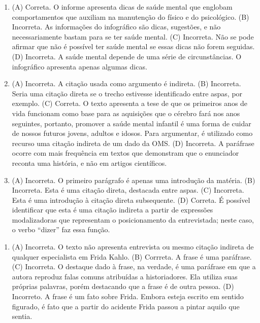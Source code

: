 \begin{enumerate}
\item (A) Correta. O informe apresenta dicas de saúde mental que englobam
comportamentos que auxiliam na manutenção do físico e do psicológico.
(B) Incorreta. As informações do infográfico são dicas, sugestões, e não
necessariamente bastam para se ter saúde mental.
(C) Incorreta. Não se pode afirmar que não é possível ter saúde mental se
essas dicas não forem seguidas.
(D) Incorreta. A saúde mental depende de uma série de circunstâncias. O
infográfico apresenta apenas algumas dicas.

\item (A) Incorreta. A citação usada como argumento é indireta.
(B) Incorreta. Seria uma citação direta se o trecho estivesse
identificado entre aspas, por exemplo.
(C) Correta. O texto apresenta a tese de que os primeiros anos de vida
funcionam como base para as aquisições que o cérebro fará nos anos
seguintes, portanto, promover a saúde mental infantil é uma forma de
cuidar de nossos futuros jovens, adultos e idosos. Para argumentar, é
utilizado como recurso uma citação indireta de um dado da OMS.
(D) Incorreta. A paráfrase ocorre com mais frequência em textos que
demonstram que o enunciador reconta uma história, e não em artigos
científicos.

\item (A) Incorreta. O primeiro parágrafo é apenas uma introdução da matéria.
(B) Incorreta. Esta é uma citação direta, destacada entre aspas.
(C) Incorreta. Esta é uma introdução à citação direta subsequente.
(D) Correta. É possível identificar que esta é uma citação indireta a
partir de expressões modalizadoras que representam o posicionamento da
entrevistada; neste caso, o verbo ``dizer'' faz essa função.
\end{enumerate}


\begin{enumerate}
\item (A) Incorreta. O texto não apresenta entrevista ou mesmo citação
indireta de qualquer especialista em Frida Kahlo.
(B) Corrreta. A frase é uma paráfrase.
(C) Incorreta. O destaque dado à frase, na verdade, é uma paráfrase em
que a autora reproduz falas comuns atribuídas a historiadores. Ela
utiliza suas próprias palavras, porém destacando que a frase é de outra
pessoa.
(D) Incorreto. A frase é um fato sobre Frida. Embora esteja escrito em
sentido figurado, é fato que a partir do acidente Frida passou a pintar
aquilo que sentia.
\end{enumerate}

